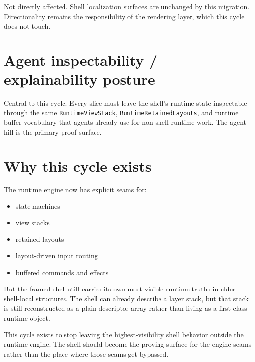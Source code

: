 Not directly affected. Shell localization surfaces are unchanged by this migration. Directionality remains the responsibility of the rendering layer, which this cycle does not touch.

\section{Agent inspectability / explainability posture}\label{record-155-agent-inspectability-explainability-posture}

Central to this cycle. Every slice must leave the shell's runtime state inspectable through the same \texttt{R\allowbreak{}u\allowbreak{}n\allowbreak{}t\allowbreak{}i\allowbreak{}m\allowbreak{}e\allowbreak{}V\allowbreak{}i\allowbreak{}e\allowbreak{}w\allowbreak{}S\allowbreak{}t\allowbreak{}a\allowbreak{}c\allowbreak{}k}, \texttt{R\allowbreak{}u\allowbreak{}n\allowbreak{}t\allowbreak{}i\allowbreak{}m\allowbreak{}e\allowbreak{}R\allowbreak{}e\allowbreak{}t\allowbreak{}a\allowbreak{}i\allowbreak{}n\allowbreak{}e\allowbreak{}d\allowbreak{}L\allowbreak{}a\allowbreak{}y\allowbreak{}o\allowbreak{}u\allowbreak{}t\allowbreak{}s}, and runtime buffer vocabulary that agents already use for non-shell runtime work. The agent hill is the primary proof surface.

\section{Why this cycle exists}\label{record-155-why-this-cycle-exists}

The runtime engine now has explicit seams for:

\begin{itemize}
\tightlist
\item
  state machines
\item
  view stacks
\item
  retained layouts
\item
  layout-driven input routing
\item
  buffered commands and effects
\end{itemize}

But the framed shell still carries its own most visible runtime truths in older shell-local structures. The shell can already describe a layer stack, but that stack is still reconstructed as a plain descriptor array rather than living as a first-class runtime object.

This cycle exists to stop leaving the highest-visibility shell behavior outside the runtime engine. The shell should become the proving surface for the engine seams rather than the place where those seams get bypassed.

